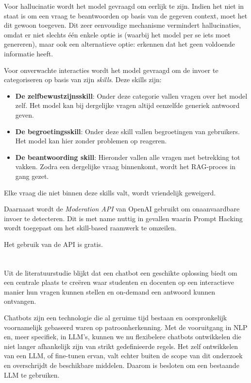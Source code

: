 Voor hallucinatie wordt het model gevraagd om eerlijk te zijn. Indien het niet in staat is om een vraag te beantwoorden op basis van de gegeven context, moet het dit gewoon toegeven. Dit zeer eenvoudige mechanisme vermindert hallucinaties, omdat er niet slechts één enkele optie is (waarbij het model per se iets moet genereren), maar ook een alternatieve optie: erkennen dat het geen voldoende informatie heeft.

Voor onverwachte interacties wordt het model gevraagd om de invoer te categoriseren op basis van zijn \emph{skills}. Deze skills zijn:

\begin{itemize}
    \item \textbf{De zelfbewustzijnsskill}: Onder deze categorie vallen vragen over het model zelf. Het model kan bij dergelijke vragen altijd eenzelfde generiek antwoord geven.
    \item \textbf{De begroetingsskill}: Onder deze skill vallen begroetingen van gebruikers. Het model kan hier zonder problemen op reageren.
    \item \textbf{De beantwoording skill}: Hieronder vallen alle vragen met betrekking tot vakken. Zodra een dergelijke vraag binnenkomt, wordt het RAG-proces in gang gezet.
\end{itemize}

Elke vraag die niet binnen deze skills valt, wordt vriendelijk geweigerd.

Daarnaast wordt de \emph{Moderation API} van OpenAI gebruikt om onaanvaardbare invoer te detecteren. Dit is met name nuttig in gevallen waarin Prompt Hacking wordt toegepast om het skill-based raamwerk te omzeilen.

Het gebruik van de API is gratis.

\section{}%
\label{sec:besluit}

Uit de literatuurstudie blijkt dat een chatbot een geschikte oplossing biedt om een centrale plaats te creëren waar studenten en docenten op een interactieve manier hun vragen kunnen stellen en on-demand een antwoord kunnen ontvangen.

Chatbots zijn een technologie die al geruime tijd bestaan en oorspronkelijk voornamelijk gebaseerd waren op patroonherkenning. Met de vooruitgang in \acrshort{NLP} en, meer specifiek, in \acrshort{LLM}'s, kunnen we nu flexibelere chatbots ontwikkelen die niet langer afhankelijk zijn van strikt gedefinieerde regels. Het zelf ontwikkelen van een \acrshort{LLM}, of fine-tunen ervan, valt echter buiten de scope van dit onderzoek en overschrijdt de beschikbare middelen. Daarom is besloten om een bestaande \acrshort{LLM} te gebruiken.

